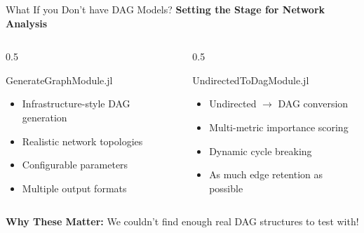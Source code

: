 \documentclass[aspectratio=169]{beamer}
\begin{document}
\begin{frame}{\textcolor{juliagreen}{What If you Don't have DAG Models?}}
\textbf{Setting the Stage for Network Analysis}

\vspace{0.2cm}

\begin{columns}
\begin{column}{0.5\textwidth}
\begin{block}{\textcolor{juliagreen}{GenerateGraphModule.jl}}
\small
\begin{itemize}
\item Infrastructure-style DAG generation
\item Realistic network topologies  
\item Configurable parameters
\item Multiple output formats
\end{itemize}
\end{block}
\end{column}
\begin{column}{0.5\textwidth}
\begin{block}{\textcolor{juliagreen}{UndirectedToDagModule.jl}}
\small
\begin{itemize}
\item Undirected $\rightarrow$ DAG conversion
\item Multi-metric importance scoring
\item Dynamic cycle breaking
\item As much edge retention  as possible
\end{itemize}
\end{block}
\end{column}
\end{columns}

\vspace{0.4cm}

\begin{center}
\textbf{Why These Matter:} We couldn't find enough real DAG structures to test with!
\end{center}
\end{frame}
\end{document}
